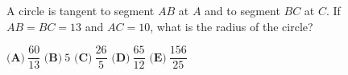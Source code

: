 A circle is tangent to segment $AB$ at $A$ and to segment $BC$ at $C$. If $AB=BC=13$ and $AC=10$, what is the radius of the circle?

$\textbf{(A)}\ $$\dfrac{60}{13}$ \qquad $\textbf{(B)}\ $$5$ \qquad $\textbf{(C)}\ $$\dfrac{26}5$ \qquad $\textbf{(D)}\ $$\dfrac{65}{12}$ \qquad $\textbf{(E)}\ $$\dfrac{156}{25}$
